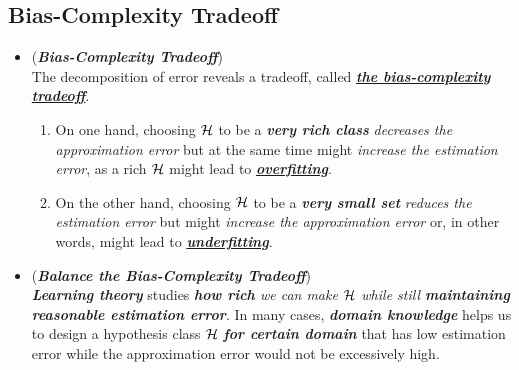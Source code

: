 \documentclass[11pt]{article}
\begin{document}
\subsection{Bias-Complexity Tradeoff}
\begin{itemize}
\item \begin{remark}(\textbf{\emph{Bias-Complexity Tradeoff}})\\
The decomposition of error reveals a tradeoff, called \underline{\emph{\textbf{the bias-complexity tradeoff}}}. 
\begin{enumerate}
\item On one hand, choosing ${\mathcal H}$ to be a \emph{\textbf{very rich class}} \emph{decreases the approximation error} but at the same time might \emph{increase the estimation error}, as a rich ${\mathcal H}$ might lead to \underline{\emph{\textbf{overfitting}}}.
\item On the other hand, choosing ${\mathcal H}$ to be a \emph{\textbf{very small set}} \emph{reduces the estimation error} but might \emph{increase the approximation error} or, in other words, might lead to \underline{\emph{\textbf{underfitting}}}.
\end{enumerate}
\end{remark}

\item \begin{remark} (\emph{\textbf{Balance the Bias-Complexity Tradeoff}})\\
\textit{\textbf{Learning theory}} studies \emph{\textbf{how rich} we can make ${\mathcal H}$ while still \textbf{maintaining reasonable estimation error}}. In many cases, \emph{\textbf{domain knowledge}} helps us to design a hypothesis class ${\mathcal H}$ \emph{\textbf{for certain domain}} that has low estimation error while the approximation error would not be excessively high.
\end{remark}


\end{itemize}
\end{document}

